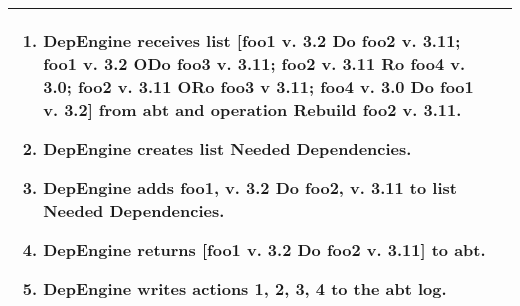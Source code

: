 \begin{tabularx}{\linewidth}{|l|X|}
\begin{minipage}{\linewidth}
  \vspace{0.05em}
  \begin{enumerate}
  \item DepEngine receives list [foo1 v. 3.2 Do foo2 v. 3.11; foo1 v. 3.2 ODo foo3 v. 3.11; foo2 v. 3.11 Ro foo4 v. 3.0; foo2 v. 3.11 ORo foo3 v 3.11; foo4 v. 3.0 Do foo1 v. 3.2] from abt and operation Rebuild foo2 v. 3.11.
 \item DepEngine creates list Needed Dependencies.
  \item DepEngine adds foo1, v. 3.2 Do foo2, v. 3.11 to list Needed Dependencies.
  \item DepEngine returns [foo1 v. 3.2 Do foo2 v. 3.11] to abt.
  \item DepEngine writes actions 1, 2, 3, 4 to the abt log.
    \end{enumerate}

  \vspace{0.05em}
\end{minipage}
\\
\hline 
\end{tabularx}
\newpage


